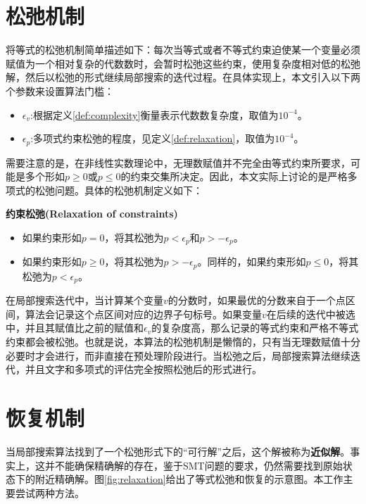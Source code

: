 \section{松弛机制}
将等式的松弛机制简单描述如下：每次当等式或者不等式约束迫使某一个变量必须赋值为一个相对复杂的代数数时，会暂时松弛这些约束，使用复杂度相对低的松弛解，然后以松弛的形式继续局部搜索的迭代过程。在具体实现上，本文引入以下两个参数来设置算法门槛：
\begin{itemize}
    \item $\epsilon_v$:根据定义\ref{def:complexity}衡量表示代数数复杂度，取值为$10^{-4}$。
    \item $\epsilon_p$:多项式约束松弛的程度，见定义\ref{def:relaxation}，取值为$10^{-4}$。
\end{itemize}


需要注意的是，在非线性实数理论中，无理数赋值并不完全由等式约束所要求，可能是多个形如$p \ge 0$或$p \le 0$的约束交集所决定。因此，本文实际上讨论的是严格多项式的松弛问题。具体的松弛机制定义如下：

\begin{definition}{\textbf{约束松弛(Relaxation of constraints)}}
\label{def:relaxation}
\begin{itemize}
    \item 如果约束形如$p = 0$，将其松弛为$p < \epsilon_p$和$p > -\epsilon_p$。
    \item 如果约束形如$p \ge 0$，将其松弛为$p > -\epsilon_p$。同样的，如果约束形如$p \le 0$，将其松弛为$p < \epsilon_p$。
\end{itemize}
\end{definition}

在局部搜索迭代中，当计算某个变量$v$的分数时，如果最优的分数来自于一个点区间，算法会记录这个点区间对应的边界子句标号。如果变量$v$在后续的迭代中被选中，并且其赋值比之前的赋值和$\epsilon_v$的复杂度高，那么记录的等式约束和严格不等式约束都会被松弛。也就是说，本算法的松弛机制是懒惰的，只有当无理数赋值十分必要时才会进行，而非直接在预处理阶段进行。当松弛之后，局部搜索算法继续迭代，并且文字和多项式的评估完全按照松弛后的形式进行。


\section{恢复机制}
当局部搜索算法找到了一个松弛形式下的“可行解”之后，这个解被称为\textbf{近似解}。事实上，这并不能确保精确解的存在，鉴于SMT问题的要求，仍然需要找到原始状态下的附近精确解。图\ref{fig:relaxation}给出了等式松弛和恢复的示意图。本工作主要尝试两种方法。

